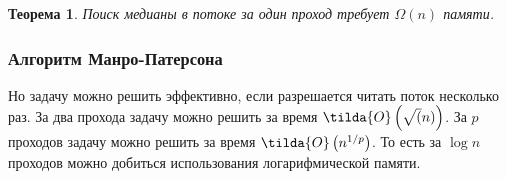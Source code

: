 \documentclass{article}
\newtheorem{theorem}{Теорема}
\begin{document}
\begin{theorem}
    Поиск медианы в потоке за один проход требует $\Omega(n)$ памяти.
\end{theorem}

\subsubsection{Алгоритм Манро-Патерсона}

Но задачу можно решить эффективно, если разрешается читать поток несколько раз.
За два прохода задачу можно решить за время $\tilda{O}\left(\sqrt(n)\right)$.
За $p$ проходов задачу можно решить за время $\tilda{O}\left(n^{1 / p}\right)$.
То есть за $\log n$ проходов можно добиться использования логарифмической памяти.
\end{document}
